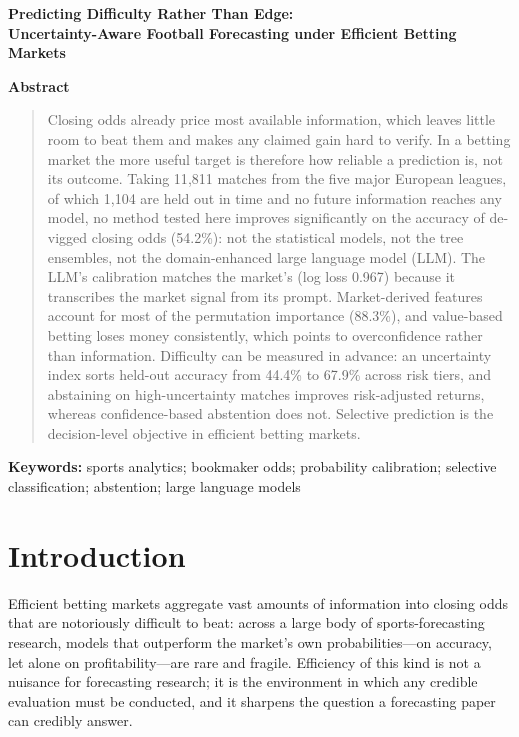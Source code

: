 \documentclass[10pt]{article}
\begin{document}
\begin{center}
{\Large\bfseries Predicting Difficulty Rather Than Edge:\\[3pt]
Uncertainty-Aware Football Forecasting under Efficient Betting Markets}
\end{center}
\vspace{0.8em}

\begin{center}{\large\bfseries Abstract}\end{center}
\begin{quote}
Closing odds already price most available information, which leaves little room
to beat them and makes any claimed gain hard to verify. In a betting market the
more useful target is therefore how reliable a prediction is, not its outcome.
Taking 11{,}811 matches from the five major European leagues, of which 1{,}104 are
held out in time and no future information reaches any model, no method tested
here improves significantly on the accuracy of de-vigged closing odds (54.2\%):
not the statistical models, not the tree ensembles, not the domain-enhanced large
language model (LLM). The LLM's calibration matches the market's (log loss
0.967) because it transcribes the market signal from its prompt. Market-derived
features account for most of the permutation importance (88.3\%), and value-based
betting loses money consistently, which points to overconfidence rather than
information. Difficulty can be measured in advance: an uncertainty index sorts
held-out accuracy from 44.4\% to
67.9\% across risk tiers, and abstaining on high-uncertainty matches improves
risk-adjusted returns, whereas confidence-based abstention does not. Selective
prediction is the decision-level objective in efficient betting markets.
\end{quote}

\vspace{0.6em}\noindent\textbf{Keywords:} sports analytics; bookmaker odds; probability calibration; selective classification; abstention; large language models



\section{Introduction}
\label{sec:intro}
Efficient betting markets aggregate vast amounts of information into closing
odds that are notoriously difficult to beat: across a large body of
sports-forecasting research, models that outperform the market's own
probabilities---on accuracy, let alone on profitability---are rare and fragile.
Efficiency of this kind is not a nuisance for forecasting research; it is the
environment in which any credible evaluation must be conducted, and it sharpens
the question a forecasting paper can credibly answer.
\end{document}
